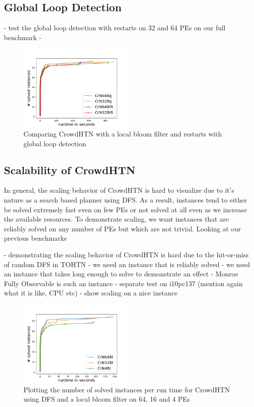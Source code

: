 \subsection{Global Loop Detection}
\label{eval: global loop}
- test the global loop detection with restarts on 32 and 64 PEs on our full benchmark
- 
\begin{figure}
	\caption{Comparing CrowdHTN with a local bloom filter and restarts with global loop detection}
	\label{figure: global loops}
	\centering
	\includegraphics[width=0.5\textwidth]{images/final/global_loops}
\end{figure}

\subsection{Scalability of CrowdHTN}
\label{eval: scalability}
In general, the scaling behavior of CrowdHTN is hard to visualize due to it's nature as a search based planner using DFS. As a result, instances tend to either be solved extremely fast even on few PEs or not solved at all even as we increase the available resources. To demonstrate scaling, we want instances that are reliably solved on any number of PEs but which are not trivial. Looking at our previous benchmarks 

- demonstrating the scaling behavior of CrowdHTN is hard due to the hit-or-miss of random DFS in TOHTN
- we need an instance that is reliably solved
- we need an instance that takes long enough to solve to demonstrate an effect
- Monroe Fully Observable is such an instance
- separate test on i10pc137 (mention again what it is like, CPU etc)
- show scaling on a nice instance

\begin{figure}
	\caption{Plotting the number of solved instances per run time for CrowdHTN using DFS and a local bloom filter on 64, 16 and 4 PEs}
	\label{figure: eval scalability}
	\centering
	\includegraphics[width=0.5\textwidth]{images/final/scalability}
\end{figure}


